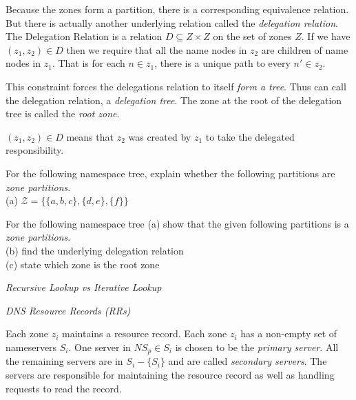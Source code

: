 Because the zones form a partition, there is a corresponding 
equivalence relation. But there is actually another underlying relation 
called the \textit{delegation relation}.
The Delegation Relation is a relation $D \subseteq Z \times Z$ 
on the set of zones $Z$. 
If we have $(z_1,z_2) \in D$ then we require that
all the name nodes in $z_2$ are children of name nodes in $z_1$. 
That is for each $n \in z_1$, there is a unique path to every $n' \in z_2$. 

This constraint forces the delegations relation to itself \textit{form a tree}. 
Thus can call the delegation relation, a \textit{delegation tree}.
The zone at the root of the delegation tree is called the \textit{root zone}.  

$(z_1,z_2) \in D$ means that $z_2$ was created 
by $z_1$ to take the delegated responsibility.

\frmrule 

\begin{example}
For the following namespace tree, explain whether the following partitions 
are \textit{zone partitions}. \\
(a) $\mathcal{Z} = \{\{a,b,c\},\{d,e\},\{f\}\}$
\end{example}


\frmrule 

\begin{example}
For the following namespace tree
(a) show that the given following partitions is a \textit{zone partitions}. \\
(b) find the underlying delegation relation\\
(c) state which zone is the root zone\\
\end{example}


\frmrule 

\textit{Recursive Lookup vs Iterative Lookup}

\frmrule 

\textit{DNS Resource Records (RRs)}

Each zone $z_i$ maintains a resource record. 
Each zone $z_i$ has a non-empty set of nameservers $S_i$. 
One server in $NS_p \in S_i$ is chosen to be the \textit{primary server}. 
All the remaining servers are in $S_i - \{S_i\}$ and are called \textit{secondary servers}. 
The servers are responsible for maintaining the resource record as well as 
handling requests to read the record. 

